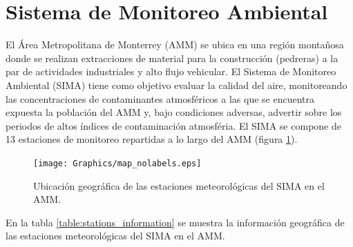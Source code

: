 \section{Sistema de Monitoreo Ambiental}

El Área Metropolitana de Monterrey (AMM) se ubica en una región montañosa donde se realizan extracciones de material para la construcción (pedreras) a la par de actividades industriales y alto flujo vehicular. El Sistema de Monitoreo Ambiental (SIMA) tiene como objetivo evaluar la calidad del aire, monitoreando las concentraciones de contaminantes atmosféricos a las que se encuentra expuesta la población del AMM y, bajo condiciones adversas, advertir sobre los periodos de altos índices de contaminación atmosféria. El SIMA se compone de 13 estaciones de monitoreo repartidas a lo largo del AMM (figura \ref{fig:stations}).

\begin{figure}[H]
	\centering
	\texttt{[image: Graphics/map\_nolabels.eps]}
	\caption{Ubicación geográfica de las estaciones meteorológicas del SIMA en el AMM.}
	\label{fig:stations}
\end{figure}

En la tabla \ref{table:stations_information} se muestra la información geográfica de las estaciones meteorológicas del SIMA en el AMM.

